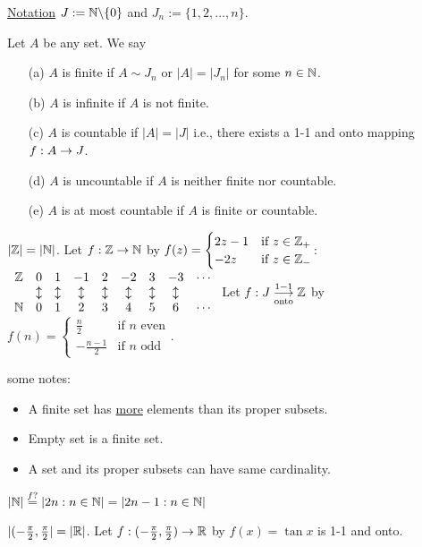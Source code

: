\documentclass[]{article}
\begin{document}
\ul{Notation} $J:= \mathbb{N}\backslash \{0\}$ and $J_n := \{1,2,\dots,n\}$.
\begin{definition}
	Let $A$ be any set. We say
	\begin{enumerate}
		\item[(a)] $A$ is finite if $A\sim J_n$ or $|A|=|J_n|$ for some $n\in\mathbb{N}$.
		\item[(b)] $A$ is infinite if $A$ is not finite.
		\item[(c)] $A$ is countable if $|A| = |J|$ i.e., there exists a 1-1 and onto mapping $f:A\rightarrow J$.
		\item[(d)] $A$ is uncountable if $A$ is neither finite nor countable.
		\item[(e)] $A$ is at most countable if $A$ is finite or countable.
	\end{enumerate}
\end{definition}
\begin{example}
$|\mathbb{Z}| = |\mathbb{N}|$. Let $f:\mathbb{Z}\rightarrow\mathbb{N}$ by $f(z) = \begin{cases} 2z-1 & \text{if } z\in\mathbb{Z}_+ \\ -2z & \text{if } z\in\mathbb{Z}_- \end{cases}$:
	$\begin{array}{ccccccccc}
			\mathbb{Z} & 0 & 1 & -1 & 2 & -2 & 3 & -3 & \cdots \\
			\, & \updownarrow & \updownarrow & \updownarrow & \updownarrow & \updownarrow & \updownarrow & \updownarrow  & \, \\
			\mathbb{N} & 0 & 1 & 2 & 3 & 4 & 5 & 6 & \cdots
	\end{array}$
Let $f:J \overset{1-1}{\underset{\text{onto}}{\longrightarrow}} \mathbb{Z}$ by $f(n) = \begin{cases} \frac{n}{2} & \text{if } n \text{ even}\\ -\frac{n-1}{2} & \text{if } n \text{ odd} \end{cases}$.
\end{example}

\begin{note} some notes:
	\begin{itemize}
		\item A finite set has \ul{more} elements than its proper subsets.
		\item Empty set is a finite set.
		\item A set and its proper subsets can have same cardinality.
	\end{itemize}
\end{note}
\begin{example}
	$|\mathbb{N}|\overset{f?}{=} |2n:n\in\mathbb{N}| = |2n-1:n\in\mathbb{N}|$
\end{example}
\begin{example}
	$|(-\frac{\pi}{2},\frac{\pi}{2}| = |\mathbb{R}|$. Let $f:(-\frac{\pi}{2},\frac{\pi}{2}) \rightarrow \mathbb{R}$ by $f(x) = \tan x$ is 1-1 and onto.
\end{example}
\end{document}
